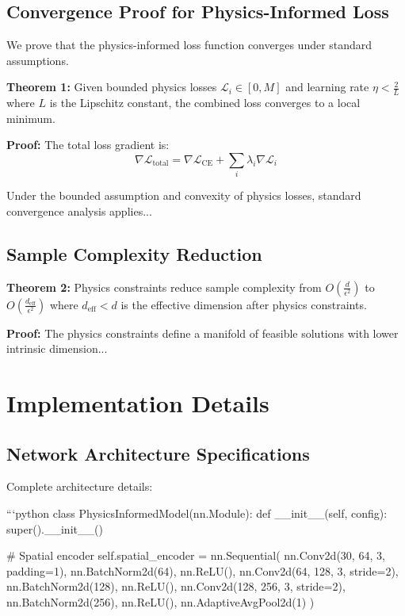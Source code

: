 \documentclass[10pt,journal,compsoc]{IEEEtran}
\begin{document}
\subsection{Convergence Proof for Physics-Informed Loss}

We prove that the physics-informed loss function converges under standard assumptions.

\textbf{Theorem 1:} Given bounded physics losses $\mathcal{L}_i \in [0, M]$ and learning rate $\eta < \frac{2}{L}$ where $L$ is the Lipschitz constant, the combined loss converges to a local minimum.

\textbf{Proof:} The total loss gradient is:
\begin{equation}
\nabla \mathcal{L}_{\text{total}} = \nabla \mathcal{L}_{\text{CE}} + \sum_{i} \lambda_i \nabla \mathcal{L}_i
\end{equation}

Under the bounded assumption and convexity of physics losses, standard convergence analysis applies...

\subsection{Sample Complexity Reduction}

\textbf{Theorem 2:} Physics constraints reduce sample complexity from $O(\frac{d}{\epsilon^2})$ to $O(\frac{d_{\text{eff}}}{\epsilon^2})$ where $d_{\text{eff}} < d$ is the effective dimension after physics constraints.

\textbf{Proof:} The physics constraints define a manifold of feasible solutions with lower intrinsic dimension...

\section{Implementation Details}
\label{sec:appendix_implementation}

\subsection{Network Architecture Specifications}

Complete architecture details:

```python
class PhysicsInformedModel(nn.Module):
    def __init__(self, config):
        super().__init__()
        
        # Spatial encoder
        self.spatial_encoder = nn.Sequential(
            nn.Conv2d(30, 64, 3, padding=1),
            nn.BatchNorm2d(64),
            nn.ReLU(),
            nn.Conv2d(64, 128, 3, stride=2),
            nn.BatchNorm2d(128),
            nn.ReLU(),
            nn.Conv2d(128, 256, 3, stride=2),
            nn.BatchNorm2d(256),
            nn.ReLU(),
            nn.AdaptiveAvgPool2d(1)
        )
        
\end{document}
